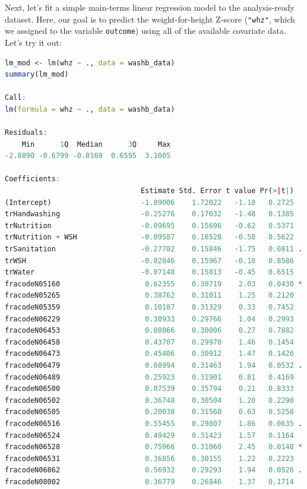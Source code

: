 \documentclass[
  12pt, krantz2,
]{krantz}
\newcommand{\passthrough}[1]{#1}
\newcommand{\1}{\mathbbm{1}}
\theoremstyle{definition}
\theoremstyle{definition}
\theoremstyle{definition}
\theoremstyle{definition}
\theoremstyle{remark}
\begin{document}
Next, let's fit a simple main-terms linear regression model to the
analysis-ready dataset. Here, our goal is to predict the weight-for-height
Z-score (\passthrough{\lstinline!"whz"!}, which we assigned to the variable \passthrough{\lstinline!outcome!}) using all of the
available covariate data. Let's try it out:

\begin{lstlisting}[language=R]
lm_mod <- lm(whz ~ ., data = washb_data)
summary(lm_mod)

Call:
lm(formula = whz ~ ., data = washb_data)

Residuals:
    Min      1Q  Median      3Q     Max 
-2.8890 -0.6799 -0.0169  0.6595  3.1005 

Coefficients:
                                Estimate Std. Error t value Pr(>|t|)   
(Intercept)                     -1.89006    1.72022   -1.10   0.2725   
trHandwashing                   -0.25276    0.17032   -1.48   0.1385   
trNutrition                     -0.09695    0.15696   -0.62   0.5371   
trNutrition + WSH               -0.09587    0.16528   -0.58   0.5622   
trSanitation                    -0.27702    0.15846   -1.75   0.0811 . 
trWSH                           -0.02846    0.15967   -0.18   0.8586   
trWater                         -0.07148    0.15813   -0.45   0.6515   
fracodeN05160                    0.62355    0.30719    2.03   0.0430 * 
fracodeN05265                    0.38762    0.31011    1.25   0.2120   
fracodeN05359                    0.10187    0.31329    0.33   0.7452   
fracodeN06229                    0.30933    0.29766    1.04   0.2993   
fracodeN06453                    0.08066    0.30006    0.27   0.7882   
fracodeN06458                    0.43707    0.29970    1.46   0.1454   
fracodeN06473                    0.45406    0.30912    1.47   0.1426   
fracodeN06479                    0.60994    0.31463    1.94   0.0532 . 
fracodeN06489                    0.25923    0.31901    0.81   0.4169   
fracodeN06500                    0.07539    0.35794    0.21   0.8333   
fracodeN06502                    0.36748    0.30504    1.20   0.2290   
fracodeN06505                    0.20038    0.31560    0.63   0.5258   
fracodeN06516                    0.55455    0.29807    1.86   0.0635 . 
fracodeN06524                    0.49429    0.31423    1.57   0.1164   
fracodeN06528                    0.75966    0.31060    2.45   0.0148 * 
fracodeN06531                    0.36856    0.30155    1.22   0.2223   
fracodeN06862                    0.56932    0.29293    1.94   0.0526 . 
fracodeN08002                    0.36779    0.26846    1.37   0.1714   

\end{lstlisting}
\end{document}
